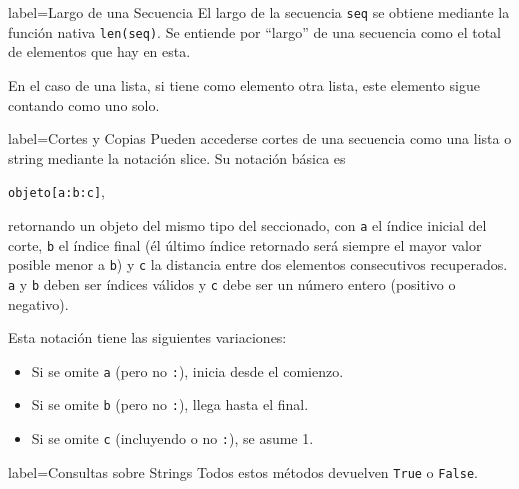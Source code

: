 \documentclass[10pt]{article}
\begin{document}
\begin{multicols*}{3}

\begin{contentbox}{label=Largo de una Secuencia}
    El largo de la secuencia \lstinline!seq! se obtiene mediante la función nativa \lstinline!len(seq)!. Se entiende por ``largo'' de una secuencia como el total de elementos que hay en esta.
    
    En el caso de una lista, si tiene como elemento otra lista, este elemento sigue contando como uno solo.
\end{contentbox}

\begin{contentbox}{label=Cortes y Copias}
    Pueden accederse \alert{cortes} de una secuencia como una lista o string mediante la \alert{notación slice}. Su notación básica es
    \begin{center}
        \lstinline!objeto[a:b:c]!,
    \end{center}
    retornando un objeto del mismo tipo del seccionado, con \lstinline!a! el índice inicial del corte, \lstinline!b! el índice final (él último índice retornado será siempre el mayor valor posible menor a \lstinline!b!) y \lstinline!c! la distancia entre dos elementos consecutivos recuperados. \lstinline!a! y \lstinline!b! deben ser índices válidos y \lstinline!c! debe ser un número entero (positivo o negativo).
    
    Esta notación tiene las siguientes variaciones:
    \begin{itemize}
        \item Si se omite \lstinline!a! (pero no \lstinline!:!), inicia desde el comienzo.
        \item Si se omite \lstinline!b! (pero no \lstinline!:!), llega hasta el final.
        \item Si se omite \lstinline!c! (incluyendo o no \lstinline!:!), se asume 1.
    \end{itemize}
\end{contentbox}

\begin{contentbox}{label=Consultas sobre Strings}
    Todos estos métodos devuelven \texttt{True} o \texttt{False}.
    

\end{contentbox}
\end{multicols*}
\end{document}
